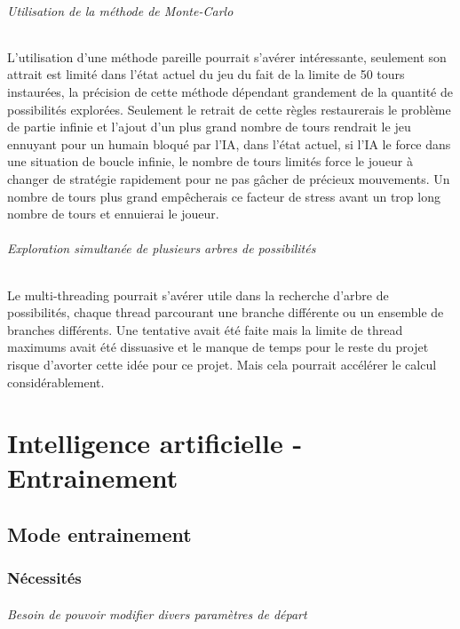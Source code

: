 \documentclass{scrreprt}
\begin{document}
			\paragraph{Utilisation de la méthode de Monte-Carlo}
			
			L'utilisation d'une méthode pareille pourrait s'avérer intéressante, seulement son attrait est limité dans l'état actuel du jeu du fait de la limite de 50 tours instaurées, la précision de cette méthode dépendant grandement de la quantité de possibilités explorées. Seulement le retrait de cette règles restaurerais  le problème de partie infinie et l'ajout d'un plus grand nombre de tours rendrait le jeu ennuyant pour un humain bloqué par l'IA, dans l'état actuel, si l'IA le force dans une situation de boucle infinie, le nombre de tours limités force le joueur à changer de stratégie rapidement pour ne pas gâcher de précieux mouvements. Un nombre de tours plus grand empêcherais ce facteur de stress avant un trop long nombre de tours et ennuierai le joueur.
			
			\paragraph{Exploration simultanée de plusieurs arbres de possibilités}
	
			Le multi-threading pourrait s'avérer utile dans la recherche d'arbre de possibilités, chaque thread parcourant une branche différente ou un ensemble de branches différents. Une tentative avait été faite mais la limite de thread maximums avait été dissuasive et le manque de temps pour le reste du projet risque d'avorter cette idée pour ce projet. Mais cela pourrait accélérer le calcul considérablement.
			
	
	
\part{Intelligence artificielle - Entrainement}	
	
	\chapter{Mode entrainement}
	
		\section{Nécessités}
			
			\paragraph{Besoin de pouvoir modifier divers paramètres de départ}
			
\end{document}
